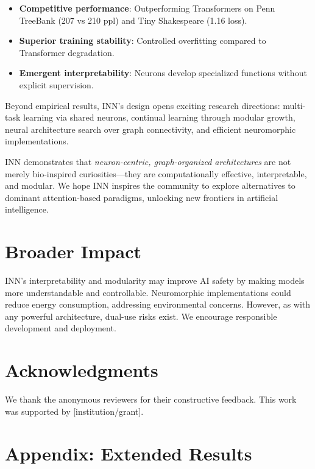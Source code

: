 \documentclass{article}
\begin{document}
\begin{itemize}
    \item \textbf{Competitive performance}: Outperforming Transformers on Penn TreeBank (207 vs 210 ppl) and Tiny Shakespeare (1.16 loss).
    \item \textbf{Superior training stability}: Controlled overfitting compared to Transformer degradation.
    \item \textbf{Emergent interpretability}: Neurons develop specialized functions without explicit supervision.
\end{itemize}

Beyond empirical results, INN's design opens exciting research directions: multi-task learning via shared neurons, continual learning through modular growth, neural architecture search over graph connectivity, and efficient neuromorphic implementations.

INN demonstrates that \emph{neuron-centric, graph-organized architectures} are not merely bio-inspired curiosities—they are computationally effective, interpretable, and modular. We hope INN inspires the community to explore alternatives to dominant attention-based paradigms, unlocking new frontiers in artificial intelligence.

\section*{Broader Impact}

INN's interpretability and modularity may improve AI safety by making models more understandable and controllable. Neuromorphic implementations could reduce energy consumption, addressing environmental concerns. However, as with any powerful architecture, dual-use risks exist. We encourage responsible development and deployment.

\section*{Acknowledgments}

We thank the anonymous reviewers for their constructive feedback. This work was supported by [institution/grant].




\newpage
\appendix

\section{Appendix: Extended Results}
\end{document}
